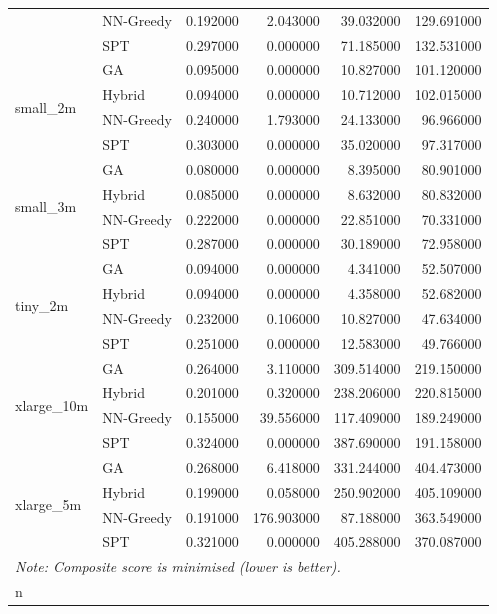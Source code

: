 \begin{tabular}{llrrrr}
 & NN-Greedy & 0.192000 & 2.043000 & 39.032000 & 129.691000 \\
 & SPT & 0.297000 & 0.000000 & 71.185000 & 132.531000 \\
\cline{1-6}
\multirow[t]{4}{*}{small_2m} & GA & 0.095000 & 0.000000 & 10.827000 & 101.120000 \\
 & Hybrid & 0.094000 & 0.000000 & 10.712000 & 102.015000 \\
 & NN-Greedy & 0.240000 & 1.793000 & 24.133000 & 96.966000 \\
 & SPT & 0.303000 & 0.000000 & 35.020000 & 97.317000 \\
\cline{1-6}
\multirow[t]{4}{*}{small_3m} & GA & 0.080000 & 0.000000 & 8.395000 & 80.901000 \\
 & Hybrid & 0.085000 & 0.000000 & 8.632000 & 80.832000 \\
 & NN-Greedy & 0.222000 & 0.000000 & 22.851000 & 70.331000 \\
 & SPT & 0.287000 & 0.000000 & 30.189000 & 72.958000 \\
\cline{1-6}
\multirow[t]{4}{*}{tiny_2m} & GA & 0.094000 & 0.000000 & 4.341000 & 52.507000 \\
 & Hybrid & 0.094000 & 0.000000 & 4.358000 & 52.682000 \\
 & NN-Greedy & 0.232000 & 0.106000 & 10.827000 & 47.634000 \\
 & SPT & 0.251000 & 0.000000 & 12.583000 & 49.766000 \\
\cline{1-6}
\multirow[t]{4}{*}{xlarge_10m} & GA & 0.264000 & 3.110000 & 309.514000 & 219.150000 \\
 & Hybrid & 0.201000 & 0.320000 & 238.206000 & 220.815000 \\
 & NN-Greedy & 0.155000 & 39.556000 & 117.409000 & 189.249000 \\
 & SPT & 0.324000 & 0.000000 & 387.690000 & 191.158000 \\
\cline{1-6}
\multirow[t]{4}{*}{xlarge_5m} & GA & 0.268000 & 6.418000 & 331.244000 & 404.473000 \\
 & Hybrid & 0.199000 & 0.058000 & 250.902000 & 405.109000 \\
 & NN-Greedy & 0.191000 & 176.903000 & 87.188000 & 363.549000 \\
 & SPT & 0.321000 & 0.000000 & 405.288000 & 370.087000 \\
\cline{1-6}
\bottomrule
\multicolumn{5}{l}{\small\textit{Note: Composite score is minimised (lower is better).}}\\n
\end{tabular}
